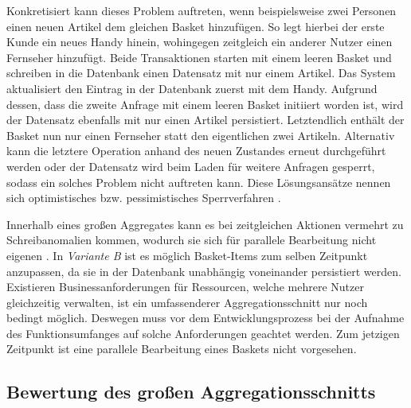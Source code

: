 Konkretisiert kann dieses Problem auftreten, wenn beispielsweise zwei Personen einen neuen Artikel dem gleichen Basket hinzufügen. So legt hierbei der erste Kunde ein neues Handy hinein, wohingegen zeitgleich ein anderer Nutzer einen Fernseher hinzufügt. Beide Transaktionen starten mit einem leeren Basket und schreiben in die Datenbank einen Datensatz mit nur einem Artikel. Das System aktualisiert den Eintrag in der Datenbank zuerst mit dem Handy. Aufgrund dessen, dass die zweite Anfrage mit einem leeren Basket initiiert worden ist, wird der Datensatz ebenfalls mit nur einen Artikel persistiert. Letztendlich enthält der Basket nun nur einen Fernseher statt den eigentlichen zwei Artikeln. Alternativ kann die letztere Operation anhand des neuen Zustandes erneut durchgeführt werden oder der Datensatz wird beim Laden für weitere Anfragen gesperrt, sodass ein solches Problem nicht auftreten kann. Diese Lösungsansätze nennen sich optimistisches bzw. pessimistisches Sperrverfahren \cite[S. 385f.]{Vernon.2015}.

Innerhalb eines großen Aggregates kann es bei zeitgleichen Aktionen vermehrt zu Schreibanomalien kommen, wodurch sie sich für parallele Bearbeitung nicht eigenen \cite[S. 2]{Vernon.2011}.  In \emph{Variante B} ist es möglich Basket-Items zum selben Zeitpunkt anzupassen, da sie in der Datenbank unabhängig voneinander persistiert werden. Existieren Businessanforderungen für Ressourcen, welche mehrere Nutzer gleichzeitig verwalten, ist ein umfassenderer Aggregationsschnitt nur noch bedingt möglich. Deswegen muss vor dem Entwicklungsprozess bei der Aufnahme des Funktionsumfanges auf solche Anforderungen geachtet werden. Zum jetzigen Zeitpunkt ist eine parallele Bearbeitung eines Baskets nicht vorgesehen.

\subsection{Bewertung des großen Aggregationsschnitts}

